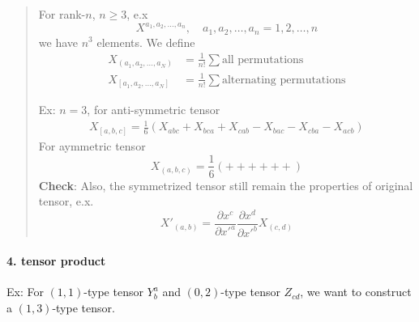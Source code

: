 \begin{quote}
	For rank-$n$, $n\geq 3$, e.x
\begin{equation}
X^{a_1,a_2,\ldots,a_n},\quad a_1,a_2,\ldots,a_n = 1,2,\ldots,n
\end{equation}
we have $n^3$ elements. We define
\begin{equation}
\begin{aligned}
X_{(a_1,a_2,\ldots,a_N)} &= \frac{1}{n!}\sum \text{all permutations}\\
X_{[a_1,a_2,\ldots,a_N]} &= \frac{1}{n!}\sum \text{alternating permutations}
\end{aligned}
\end{equation}


Ex: $n=3$, for anti-symmetric tensor
\begin{equation}
\begin{aligned}
X_{[a,b,c]} = \frac{1}{6} \left(
X_{abc}+X_{bca}+X_{cab}
-X_{bac}-X_{cba}-X_{acb}\right)
\end{aligned}
\end{equation}
For aymmetric tensor
\begin{equation}
X_{(a,b,c)} = \frac{1}{6}\left(++++++\right)
\end{equation}
\textbf{Check}: Also, the symmetrized tensor still remain the properties of original tensor, e.x.
\begin{equation}
X'_{(a,b)} = \frac{\partial x^{c}}{\partial x'^{a}}\frac{\partial x^d}{\partial x'^{b}}X_{(c,d)}
\end{equation}

\end{quote}
\paragraph{4. tensor product} %

Ex: For $(1,1)$-type tensor $Y^{a}_{b}$ and $(0,2)$-type tensor $Z_{cd}$, we want to construct a $(1,3)$-type tensor. 

